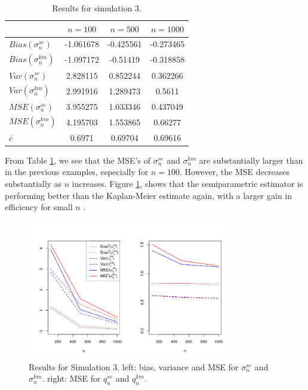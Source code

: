 \begin{table}[h!]
	\begin{center}

	\begin{tabular}{| l || c | c | c |}	
		\hline
		& $ n = 100 $ & $ n = 500 $ & $ n = 1000 $\\
		\hline
		\hline
		$Bias(\sigma_n^{se})$ & -1.061678 & -0.425561 & -0.273465\\
		$Bias(\sigma_n^{km})$ & -1.097172 & -0.51419 & -0.318858\\
		\hline
		$Var(\sigma_n^{se})$ & 2.828115 & 0.852244 & 0.362266\\
		$Var(\sigma_n^{km})$ & 2.991916 & 1.289473 & 0.5611\\
		\hline
		$MSE(\sigma_n^{se})$ & 3.955275 & 1.033346 & 0.437049\\
		$MSE(\sigma_n^{km})$ & 4.195703 & 1.553865 & 0.66277\\
		\hline
		\hline
		$\bar c$ & 0.6971 & 0.69704 & 0.69616\\
		\hline
	\end{tabular}
	\end{center}
	\caption{Results for simulation 3.}
	\label{tab:res_exppar1}
\end{table}
%
\noindent From Table \ref{tab:res_exppar1}, we see that the MSE's of $\sigma_n^{se}$ and $\sigma_n^{km}$ are substantially larger than in the previous examples, especially for $n=100$. However, the MSE decreases substantially as $n$ increases. Figure \ref{fig:mse_exppar}, shows that the semiparametric estimator is performing better than the Kaplan-Meier estimate again, with a larger gain in efficiency for small $n$ .
\begin{figure}[h!]
	\begin{center}
		\includegraphics[width=0.8\textwidth]{./figures/exppar_mse2}
	\end{center}
	\caption{Results for Simulation 3. left: bias, variance and MSE for $\sigma_n^{se}$ and $\sigma_n^{km}$. right: MSE for $q_n^{se}$ and $q_n^{km}$.}
	\label{fig:mse_exppar}
\end{figure}
